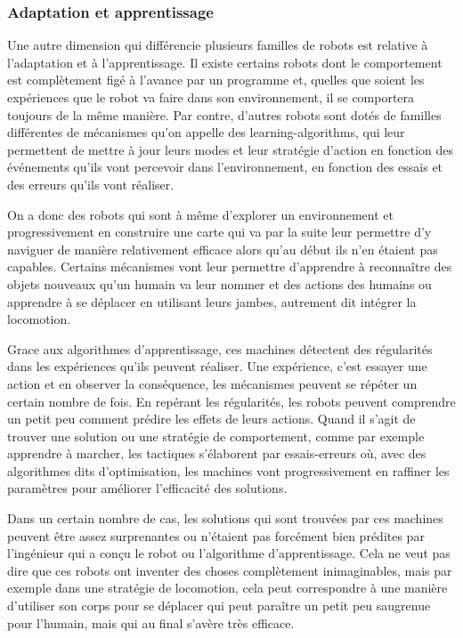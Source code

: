 \subsubsection[Adaptation et apprentissage]{Adaptation et apprentissage}
\label{subsub:III.2.1.3}

Une autre dimension qui différencie plusieurs familles de robots est relative à l'adaptation et à l'apprentissage. Il existe certains robots dont le comportement est complètement figé à l'avance par un programme et, quelles que soient les expériences que le robot va faire dans son environnement, il se comportera toujours de la même manière. Par contre, d'autres robots sont dotés de familles différentes de mécanismes qu'on appelle des \glspl{learning-algorithm}, qui leur permettent de mettre à jour leurs modes et leur stratégie d'action en fonction des événements qu'ils vont percevoir dans l'environnement, en fonction des essais et des erreurs qu'ils vont réaliser. 

On a donc des robots qui sont à même d'explorer un environnement et progressivement en construire une carte qui va par la suite leur permettre d'y naviguer de manière relativement efficace alors qu'au début ils n'en étaient pas capables. Certains mécanismes vont leur permettre d'apprendre à reconnaître des objets nouveaux qu'un humain va leur nommer et des actions des humains ou apprendre à se déplacer en utilisant leurs jambes, autrement dit intégrer la locomotion. 

Grace aux algorithmes d'apprentissage, ces machines détectent des régularités dans les expériences qu'ils peuvent réaliser. Une expérience, c'est essayer une action et en observer la conséquence, les mécanismes peuvent se répéter un certain nombre de fois. En repérant les régularités, les robots peuvent comprendre un petit peu comment prédire les effets de leurs actions. Quand il s'agit de trouver une solution ou une stratégie de comportement, comme par exemple apprendre à marcher, les tactiques s'élaborent par essais-erreurs où, avec des algorithmes dits d'optimisation, les machines vont progressivement en raffiner les paramètres pour améliorer l'efficacité des solutions. 

Dans un certain nombre de cas, les solutions qui sont trouvées par ces machines peuvent être assez surprenantes ou n'étaient pas forcément bien prédites par l'ingénieur qui a conçu le robot ou l'algorithme d'apprentissage. Cela ne veut pas dire que ces robots ont inventer des choses complètement inimaginables, mais par exemple dans une stratégie de locomotion, cela peut correspondre à une manière d'utiliser son corps pour se déplacer qui peut paraître un petit peu saugrenue pour l'humain, mais qui au final s'avère très efficace. 

